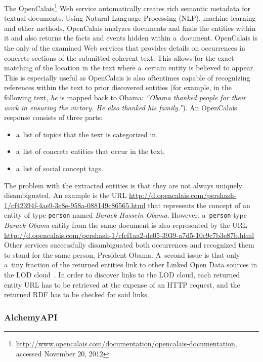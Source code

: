The
OpenCalais\footnote{\url{http://www.opencalais.com/documentation/opencalais-documentation},
accessed November 20, 2012}
Web service automatically creates rich semantic metadata
for textual documents.
Using Natural Language Processing (NLP),
machine learning and other methods, OpenCalais analyzes documents
and finds the entities within it and also returns the facts and
events hidden within a~document.
OpenCalais is the only of the examined Web services
that provides details on occurrences in concrete sections
of the submitted coherent text.
This allows for the exact matching of the location in the text
where a~certain entity is believed to appear.
This is especially useful as OpenCalais
is also oftentimes capable of recognizing references
within the text to prior discovered entities
(for example, in the following text,
\emph{he} is mapped back to Obama: \textit{``\emph{Obama}
thanked people for their work in ensuring the victory.
\emph{He} also thanked his family.''}).
An OpenCalais response consists of three parts:

\begin{itemize}
  \item a~list of topics that the text is categorized in.
  \item a~list of concrete entities that occur in the text.
  \item a~list of social concept tags.
\end{itemize}

The problem with the extracted entities is
that they are not always uniquely disambiguated.
An example is the URL \url{http://d.opencalais.com/pershash-1/cf42394f-4ae9-3e8e-958a-088149c86565.html}
that represents the concept of an entity of type \texttt{person}
named \emph{Barack Hussein Obama}.
However, a~\texttt{person}-type \emph{Barack Obama} entity from the same document is also represented by the URL
\url{http://d.opencalais.com/pershash-1/cfcf1aa2-de05-3939-a7d5-10c9c7b3e87b.html}
Other services successfully disambiguated both occurrences and
recognized them to stand for the same person, President Obama.
A~second issue is that only a~tiny fraction of the returned
entities link to other Linked Open Data sources in the
LOD cloud~\cite{bizer2011statelodcloud,cyganiak2011lodcloud}.
In order to discover links to the LOD cloud,
each returned entity URL has to be retrieved at the expense
of an HTTP request, and the returned RDF has to be checked
for said links.

\subsubsection{AlchemyAPI}

